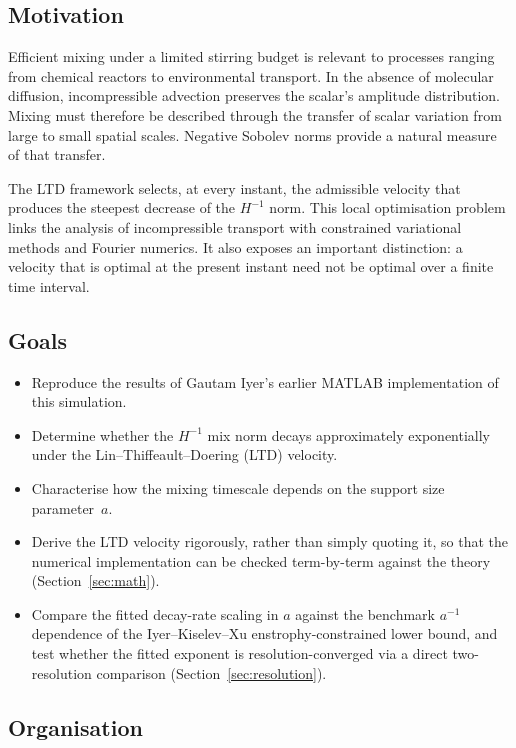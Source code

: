 \documentclass[12pt,a4paper]{article}
\theoremstyle{definition}
\theoremstyle{plain}
\begin{document}
\subsection{Motivation}

Efficient mixing under a limited stirring budget is relevant to processes
ranging from chemical reactors to environmental transport. In the absence
of molecular diffusion, incompressible advection preserves the scalar's
amplitude distribution. Mixing must therefore be described through the
transfer of scalar variation from large to small spatial scales. Negative
Sobolev norms provide a natural measure of that transfer.

The LTD framework selects, at every instant, the admissible velocity that
produces the steepest decrease of the $H^{-1}$ norm. This local optimisation
problem links the analysis of incompressible transport with constrained
variational methods and Fourier numerics. It also exposes an important
distinction: a velocity that is optimal at the present instant need not be
optimal over a finite time interval.

\subsection{Goals}
\begin{itemize}
  \item Reproduce the results of Gautam Iyer's earlier MATLAB implementation
        of this simulation.
  \item Determine whether the $H^{-1}$ mix norm decays approximately
        exponentially under the Lin--Thiffeault--Doering (LTD) velocity.
  \item Characterise how the mixing timescale depends on the support
        size parameter~$a$.
  \item Derive the LTD velocity rigorously, rather than simply quoting it,
        so that the numerical implementation can be checked term-by-term
        against the theory (Section~\ref{sec:math}).
  \item Compare the fitted decay-rate scaling in $a$ against the benchmark
        $a^{-1}$ dependence of the Iyer--Kiselev--Xu enstrophy-constrained
        lower bound, and test whether the fitted exponent is
        resolution-converged via a direct two-resolution comparison
        (Section~\ref{sec:resolution}).
\end{itemize}

\subsection{Organisation}
\end{document}
